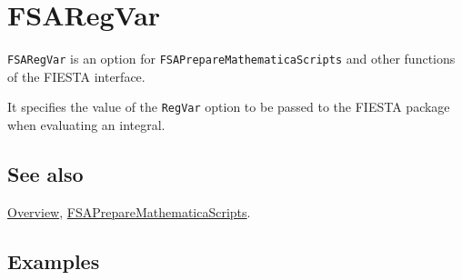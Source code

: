 \documentclass[../FeynHelpersManual.tex]{subfiles}
\begin{document}
\hypertarget{fsaregvar}{
\section{FSARegVar}\label{fsaregvar}}

\texttt{FSARegVar} is an option for
\texttt{FSAPrepareMathematicaScripts} and other functions of the FIESTA
interface.

It specifies the value of the \texttt{RegVar} option to be passed to the
FIESTA package when evaluating an integral.

\subsection{See also}

\hyperlink{toc}{Overview},
\hyperlink{fsapreparemathematicascripts}{FSAPrepareMathematicaScripts}.

\subsection{Examples}
\end{document}
